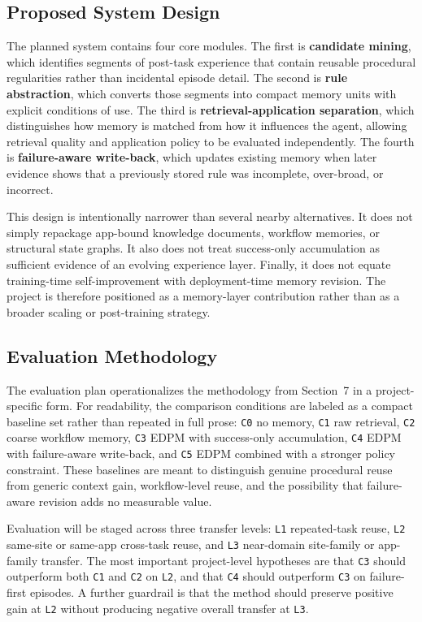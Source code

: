 \documentclass{article}
\begin{document}
\subsection{Proposed System Design}\label{83-proposed-system-design}

The planned system contains four core modules. The first is
\textbf{candidate mining}, which identifies segments of post-task
experience that contain reusable procedural regularities rather than
incidental episode detail. The second is \textbf{rule abstraction},
which converts those segments into compact memory units with explicit
conditions of use. The third is
\textbf{retrieval-application separation}, which distinguishes how
memory is matched from how it influences the agent, allowing retrieval
quality and application policy to be evaluated independently. The fourth
is \textbf{failure-aware write-back}, which updates existing memory when
later evidence shows that a previously stored rule was incomplete,
over-broad, or incorrect.

This design is intentionally narrower than several nearby alternatives.
It does not simply repackage app-bound knowledge documents, workflow
memories, or structural state graphs. It also does not treat
success-only accumulation as sufficient evidence of an evolving
experience layer. Finally, it does not equate training-time
self-improvement with deployment-time memory revision. The project is
therefore positioned as a memory-layer contribution rather than as a
broader scaling or post-training strategy.

\subsection{Evaluation Methodology}\label{84-evaluation-methodology}

The evaluation plan operationalizes the methodology from Section~7 in a
project-specific form. For readability, the comparison conditions are
labeled as a compact baseline set rather than repeated in full prose:
\texttt{C0} no memory, \texttt{C1} raw retrieval,
\texttt{C2} coarse workflow memory, \texttt{C3} EDPM with success-only
accumulation, \texttt{C4} EDPM with failure-aware write-back, and
\texttt{C5} EDPM combined with a stronger policy constraint. These
baselines are meant to distinguish genuine procedural reuse from generic
context gain, workflow-level reuse, and the possibility that
failure-aware revision adds no measurable value.

Evaluation will be staged across three transfer levels: \texttt{L1}
repeated-task reuse, \texttt{L2} same-site or same-app cross-task reuse,
and \texttt{L3} near-domain site-family or app-family transfer. The most
important project-level hypotheses are that \texttt{C3} should
outperform both \texttt{C1} and \texttt{C2} on \texttt{L2}, and that
\texttt{C4} should outperform \texttt{C3} on failure-first episodes. A
further guardrail is that the method should preserve positive gain at
\texttt{L2} without producing negative overall transfer at
\texttt{L3}.
\end{document}
